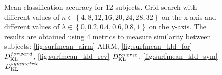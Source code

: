 \begin{figure}[h!]
\centering
{}

\caption{Mean classification accuracy for 12 subjects. Grid search with different values of  $n \in \left\lbrace 4, 8, 12, 16, 20, 24, 28, 32 \right\rbrace $ on the x-axis and different values of $\lambda \in \left\lbrace 0, 0.2, 0.4, 0.6, 0.8, 1 \right\rbrace$ on the y-axis. The results are obtained using 4 metrics to measure similarity between subjects: \ref{fig:surfmean_airm} AIRM, \ref{fig:surfmean_kld_for} $D_{\operatorname{KL}}^{forward}$, \ref{fig:surfmean_kld_rev} $D_{\operatorname{KL}}^{reverse}$, \ref{fig:surfmean_kld_sym} $D_{\operatorname{KL}}^{symmetric}$}
\end{figure}

